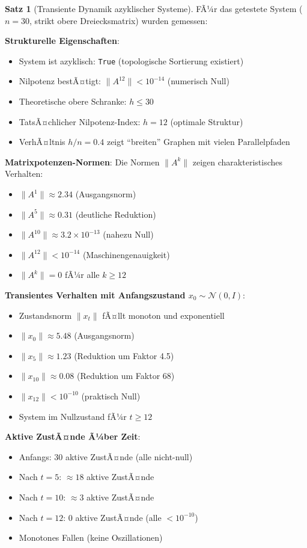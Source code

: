 ﻿\documentclass[a4paper,12pt]{report}
\theoremstyle{definition}
\newtheorem{satz}{Satz}
\begin{document}
	\begin{satz}[Transiente Dynamik azyklischer Systeme]
		FÃ¼r das getestete System ($n=30$, strikt obere Dreiecksmatrix) wurden gemessen:
		
		\textbf{Strukturelle Eigenschaften}:
		\begin{itemize}
			\item System ist azyklisch: \texttt{True} (topologische Sortierung existiert)
			\item Nilpotenz bestÃ¤tigt: $\|A^{12}\| < 10^{-14}$ (numerisch Null)
			\item Theoretische obere Schranke: $h \leq 30$
			\item TatsÃ¤chlicher Nilpotenz-Index: $h = 12$ (optimale Struktur)
			\item VerhÃ¤ltnis $h/n = 0.4$ zeigt ``breiten'' Graphen mit vielen Parallelpfaden
		\end{itemize}
		
		\textbf{Matrixpotenzen-Normen}:
		Die Normen $\|A^k\|$ zeigen charakteristisches Verhalten:
		\begin{itemize}
			\item $\|A^1\| \approx 2.34$ (Ausgangsnorm)
			\item $\|A^5\| \approx 0.31$ (deutliche Reduktion)
			\item $\|A^{10}\| \approx 3.2 \times 10^{-13}$ (nahezu Null)
			\item $\|A^{12}\| < 10^{-14}$ (Maschinengenauigkeit)
			\item $\|A^k\| = 0$ fÃ¼r alle $k \geq 12$
		\end{itemize}
		
		\textbf{Transientes Verhalten mit Anfangszustand $x_0 \sim \mathcal{N}(0, I)$}:
		\begin{itemize}
			\item Zustandsnorm $\|x_t\|$ fÃ¤llt monoton und exponentiell
			\item $\|x_0\| \approx 5.48$ (Ausgangsnorm)
			\item $\|x_5\| \approx 1.23$ (Reduktion um Faktor 4.5)
			\item $\|x_{10}\| \approx 0.08$ (Reduktion um Faktor 68)
			\item $\|x_{12}\| < 10^{-10}$ (praktisch Null)
			\item System im Nullzustand fÃ¼r $t \geq 12$
		\end{itemize}
		
		\textbf{Aktive ZustÃ¤nde Ã¼ber Zeit}:
		\begin{itemize}
			\item Anfangs: 30 aktive ZustÃ¤nde (alle nicht-null)
			\item Nach $t=5$: $\approx 18$ aktive ZustÃ¤nde
			\item Nach $t=10$: $\approx 3$ aktive ZustÃ¤nde
			\item Nach $t=12$: 0 aktive ZustÃ¤nde (alle $< 10^{-10}$)
			\item Monotones Fallen (keine Oszillationen)
		\end{itemize}
	\end{satz}
	
\end{document}
